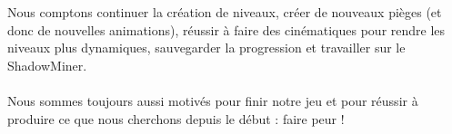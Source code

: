 \documentclass[titlepage, 13px, a4paper]{report}
\begin{document}
Nous comptons continuer la création de niveaux, créer de nouveaux pièges (et donc de nouvelles animations), réussir à faire des cinématiques 
pour rendre les niveaux plus dynamiques, sauvegarder la progression et travailler sur le ShadowMiner. \\ \\

Nous sommes toujours aussi motivés pour finir notre jeu et pour réussir à produire ce que nous cherchons depuis le début : faire peur ! \\ 
\end{document}

